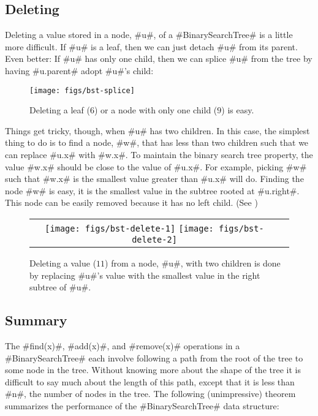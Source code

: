 \subsection{Deleting}

Deleting a value stored in a node, #u#, of a #BinarySearchTree# is a
little more difficult.  If #u# is a leaf, then we can just detach #u#
from its parent.  Even better: If #u# has only one child, then we can
splice #u# from the tree by having #u.parent# adopt #u#'s child:

\begin{figure}
  \begin{center}
    \texttt{[image: figs/bst-splice]}
  \end{center}
  \caption{Deleting a leaf ($6$) or a node with only one child ($9$) is easy.}
\end{figure}

Things get tricky, though, when #u# has two children.  In this case,
the simplest thing to do is to find a node, #w#, that has less than two
children such that we can replace #u.x# with #w.x#.
To maintain the
binary search tree property, the value #w.x# should be close to the value
of #u.x#.  For example, picking #w# such that #w.x# is the smallest value greater
than #u.x# will do.  Finding the node #w# is easy, it is the smallest
value in the subtree rooted at #u.right#.  This node can be easily removed because it has no left child.  (See )

\begin{figure}
  \begin{center}
    \begin{tabular}{cc}
    \texttt{[image: figs/bst-delete-1]}
    \texttt{[image: figs/bst-delete-2]}
    \end{tabular}
  \end{center}
  \caption{Deleting a value ($11$) from a node, #u#, with two children is done by replacing #u#'s value with the smallest value in the right subtree of #u#.}
\end{figure}

\subsection{Summary}

The #find(x)#, #add(x)#, and #remove(x)# operations in a
#BinarySearchTree# each involve following a path from the root of the
tree to some node in the tree. Without knowing more about the shape of
the tree it is difficult to say much about the length of this path,
except that it is less than #n#, the number of nodes in the tree.
The following (unimpressive) theorem summarizes the performance of the
#BinarySearchTree# data structure:

